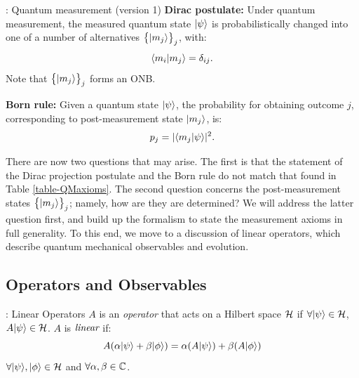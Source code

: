 \begin{axiombox}{: Quantum measurement (version 1)}\label{axiom-measurementver1}
    \textbf{Dirac postulate:} Under quantum measurement, the measured quantum state $\lvert \psi \rangle$ is probabilistically changed into one of a number of alternatives $\set{\lvert m_j \rangle}_j$, with:
    \begin{equation}
        \langle m_i \lvert m_j \rangle = \delta_{ij}.
    \end{equation}
    Note that $\set{\lvert m_j \rangle}_j$ forms an ONB.
    
    \textbf{Born rule:} Given a quantum state $\lvert \psi \rangle$, the probability for obtaining outcome $j$, corresponding to post-measurement state $\lvert m_j \rangle$, is:
    \begin{equation}
        p_j = \lvert \langle m_j \lvert \psi \rangle \rvert^2.
    \end{equation}
\end{axiombox}

There are now two questions that may arise. The first is that the statement of the Dirac projection postulate and the Born rule do not match that found in Table \ref{table-QMaxioms}. The second question concerns the post-measurement states $\set{\lvert m_j \rangle}_j$; namely, how are they are determined? We will address the latter question first, and build up the formalism to state the measurement axioms in full generality. To this end, we move to a discussion of linear operators, which describe quantum mechanical observables and evolution. 

\subsection{Operators and Observables}

\begin{defbox}{: Linear Operators}\label{def-linops}
    $A$ is an \emph{operator} that acts on a Hilbert space $\mathcal{H}$ if $\forall \lvert \psi \rangle \in \mathcal{H}$, $A\lvert \psi \rangle \in \mathcal{H}$. $A$ is $\emph{linear}$ if:
    \begin{equation}
        A(\alpha\ket{\psi} + \beta\ket{\phi}) = \alpha(A\ket{\psi}) + \beta(A\ket{\phi})
    \end{equation}
    $\forall \ket{\psi}, \ket{\phi} \in \H$ and $\forall \alpha, \beta \in \mathbb{C}$.
\end{defbox}

